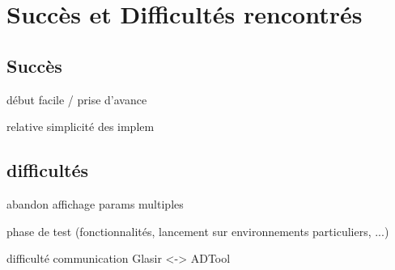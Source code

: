 \section{Succès et Difficultés rencontrés}
\subsection{Succès}

début facile / prise d'avance

relative simplicité des implem

\subsection{difficultés}

abandon affichage params multiples

phase de test (fonctionnalités, lancement sur environnements particuliers, ...)

difficulté communication Glasir <-> ADTool
